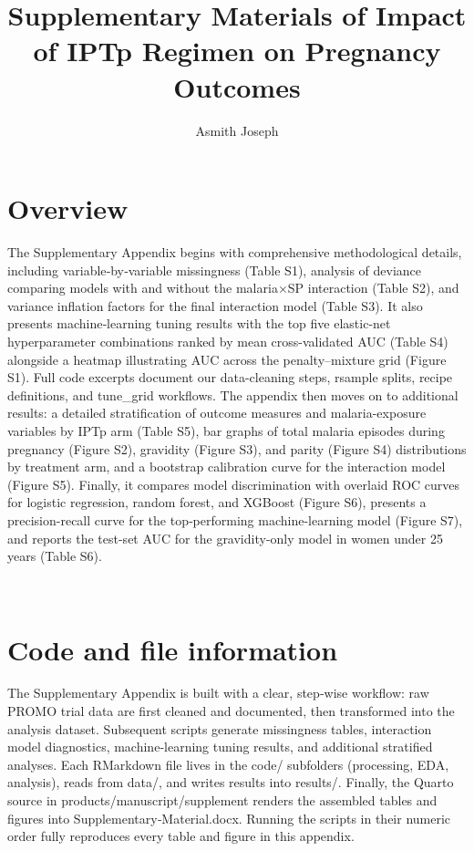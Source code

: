 \documentclass[
  letterpaper,
  DIV=11,
  numbers=noendperiod]{scrartcl}
\title{Supplementary Materials of Impact of IPTp Regimen on Pregnancy
Outcomes}
\author{Asmith Joseph}
\date{}
\begin{document}
\maketitle


\newpage{}

\section{Overview}\label{overview}

The Supplementary Appendix begins with comprehensive methodological
details, including variable‐by‐variable missingness (Table S1), analysis
of deviance comparing models with and without the malaria×SP interaction
(Table S2), and variance inflation factors for the final interaction
model (Table S3). It also presents machine‐learning tuning results with
the top five elastic-net hyperparameter combinations ranked by mean
cross-validated AUC (Table S4) alongside a heatmap illustrating AUC
across the penalty--mixture grid (Figure S1). Full code excerpts
document our data-cleaning steps, rsample splits, recipe definitions,
and tune\_grid workflows. The appendix then moves on to additional
results: a detailed stratification of outcome measures and
malaria-exposure variables by IPTp arm (Table S5), bar graphs of total
malaria episodes during pregnancy (Figure S2), gravidity (Figure S3),
and parity (Figure S4) distributions by treatment arm, and a bootstrap
calibration curve for the interaction model (Figure S5). Finally, it
compares model discrimination with overlaid ROC curves for logistic
regression, random forest, and XGBoost (Figure S6), presents a
precision-recall curve for the top‐performing machine-learning model
(Figure S7), and reports the test-set AUC for the gravidity-only model
in women under 25 years (Table S6).

~ ~

\section{Code and file information}\label{code-and-file-information}

The Supplementary Appendix is built with a clear, step‑wise workflow:
raw PROMO trial data are first cleaned and documented, then transformed
into the analysis dataset. Subsequent scripts generate missingness
tables, interaction model diagnostics, machine‑learning tuning results,
and additional stratified analyses. Each RMarkdown file lives in the
code/ subfolders (processing, EDA, analysis), reads from data/, and
writes results into results/. Finally, the Quarto source in
products/manuscript/supplement renders the assembled tables and figures
into Supplementary‑Material.docx. Running the scripts in their numeric
order fully reproduces every table and figure in this appendix.
\end{document}
